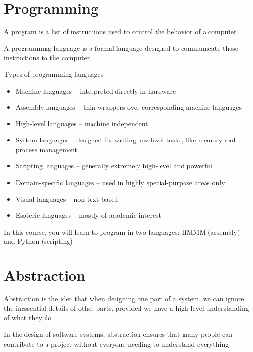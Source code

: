 \documentclass[8pt,a4paper,compress]{beamer}
\begin{document}
\section{Programming}
\begin{frame}[fragile]
\pause

A program is a list of instructions used to control the behavior of a computer

\pause
\bigskip

A programming language is a formal language designed to communicate those instructions to the computer

\pause
\bigskip

Types of programming languages
\begin{itemize}
\item Machine languages -- interpreted directly in hardware
\item Assembly languages -- thin wrappers over corresponding machine languages
\item High-level languages -- machine independent
\item System languages -- designed for writing low-level tasks, like memory and process management
\item Scripting languages -- generally extremely high-level and powerful
\item Domain-specific languages -- used in highly special-purpose areas only
\item Visual languages -- non-text based
\item Esoteric languages -- mostly of academic interest
\end{itemize}

\pause
\bigskip

In this course, you will learn to program in two languages: HMMM (assembly) and Python (scripting)
\end{frame}

\section{Abstraction}
\begin{frame}[fragile]
\pause

Abstraction is the idea that when designing one part of a system, we can ignore the inessential details of other parts, provided we have a high-level understanding of what they do

\pause
\bigskip

In the design of software systems, abstraction ensures that many people can contribute to a project without everyone needing to understand everything
\end{frame}
\end{document}
